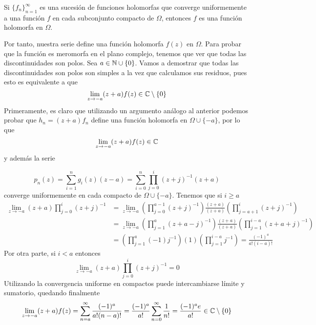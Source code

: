 \documentclass[twoside]{article}
\begin{document}
\begin{ejercicio}{1}
\begin{solucion}
\begin{theorem}
Si $\{f_n\}_{n=1}^\infty$ es una sucesión de funciones holomorfas que converge uniformemente a una función $f$ en cada subconjunto compacto de $\Omega$, entonces $f$ es una función holomorfa en $\Omega$.
\end{theorem}

Por tanto, nuestra serie define una función holomorfa $f(z)$ en $\Omega$. Para probar que la función es meromorfa en el plano complejo, tenemos que ver que todas las discontinuidades son polos. Sea $a\in \mathbb{N}\cup\{0\}$. Vamos a demostrar que todas las discontinuidades son polos son simples a la vez que calculamos sus residuos, pues esto es equivalente a que 
$$
\lim_{z\to -a}(z+a)f(z) \in\mathbb{C}\setminus\{0\}
$$
Primeramente, es claro que utilizando un argumento análogo al anterior podemos probar que $h_n = (z+a)f_n$ define una función holomorfa en $\Omega \cup\{-a\}$, por lo que 
$$
\lim_{z\to -a}(z+a)f(z) \in\mathbb{C}
$$
y además la serie

$$
p_n(z) = \sum_{i=1}^n g_i(z) (z-a) = \sum_{i=0}^n \prod_{j=0}^i (z+j)^{-1}(z+a)
$$
converge uniformemente en cada compacto de $\Omega\cup\{-a\}$.  Tenemos que si $i\geq a$
\begin{align*}
\lim_{z\to -a}(z+a)\prod_{j=0}^i \left(z+j\right)^{-1}& =  \lim_{z\rightarrow-a}\left(\prod_{j=0}^{a-1}(z+j)^{-1}\right)\frac{(z+a)}{(z+a)}\left(\prod_{j=a+1}^{i}(z+j)^{-1}\right)\\
&=\lim_{z\rightarrow-a}\left(\prod_{j=1}^{a}(z+a-j)^{-1}\right)\frac{(z+a)}{(z+a)}\left(\prod_{j=1}^{i-a}(z+a+j)^{-1}\right) \\
&=\left(\prod_{j=1}^{a}(-1)j^{-1}\right)(1)\left(\prod_{j=1}^{i-a}j^{-1}\right)=\frac{(-1)^a}{a!(i-a)!}
\end{align*}
Por otra parte, si $i<a$ entonces
$$
\lim_{z\to -a}(z+a)\prod_{j=0}^i \left(z+j\right)^{-1} = 0
$$
Utilizando la convergencia uniforme en compactos puede intercambiarse límite y sumatorio, quedando finalmente
$$
\lim_{z\to -a}(z+a)f(z) = \sum_{n=a}^\infty \frac{(-1)^a}{a!(n-a)!} = \frac{(-1)^a}{a!}\sum_{n=0}^\infty \frac{1}{n!} = \frac{(-1)^a e}{a!} \in \mathbb{C}\setminus\{0\}
$$
\end{solucion}
\end{ejercicio}
\newpage
\end{document}
